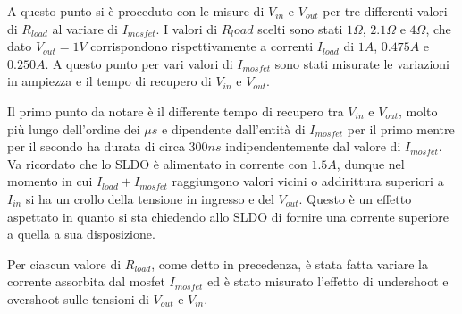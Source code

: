A questo punto si è proceduto con le misure di $V_{in}$ e $V_{out}$ per tre differenti valori di $R_{load}$ al variare di $I_{mosfet}$. I valori di $R_load$ scelti sono stati $1 \Omega$, $2.1 \Omega$ e $4 \Omega$, che dato $V_{out}=1V$ corrispondono rispettivamente a correnti  $I_{load}$ di $1A$, $0.475 A$ e $0.250A$. A questo punto per vari valori di $I_{mosfet}$ sono stati misurate le variazioni in ampiezza e il tempo di recupero di $V_{in}$ e $V_{out}$.

Il primo punto da notare è il differente tempo di recupero tra $V_{in}$ e $V_{out}$, molto più lungo dell'ordine dei $\mu s$ e dipendente dall'entità di $I_{mosfet}$ per il primo mentre per il secondo ha durata di circa $300 ns$ indipendentemente dal valore di $I_{mosfet}$.
Va ricordato che lo SLDO è alimentato in corrente con $1.5A$, dunque nel momento in cui $I_{load}+I_{mosfet}$ raggiungono valori vicini o addirittura superiori  a $I_{in}$ si ha un crollo della tensione in ingresso e del $V_{out}$. Questo è un effetto aspettato in quanto si sta chiedendo allo SLDO di fornire una corrente superiore a quella a sua disposizione.


Per ciascun valore di $R_{load}$, come detto in precedenza, è stata fatta variare la corrente assorbita dal mosfet $I_{mosfet}$ ed è stato misurato l'effetto di undershoot e overshoot sulle tensioni di $V_{out}$ e $V_{in}$.

\section{}

